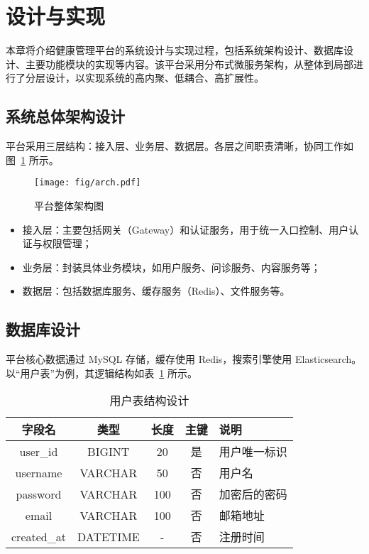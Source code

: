 \section{设计与实现}

本章将介绍健康管理平台的系统设计与实现过程，包括系统架构设计、数据库设计、主要功能模块的实现等内容。该平台采用分布式微服务架构，从整体到局部进行了分层设计，以实现系统的高内聚、低耦合、高扩展性。

\subsection{系统总体架构设计}

平台采用三层结构：接入层、业务层、数据层。各层之间职责清晰，协同工作如图~\ref{fig:arch} 所示。

\begin{figure}[H]
\centering
\texttt{[image: fig/arch.pdf]}
\caption{平台整体架构图}
\label{fig:arch}
\end{figure}

\begin{itemize}
  \item 接入层：主要包括网关（Gateway）和认证服务，用于统一入口控制、用户认证与权限管理；
  \item 业务层：封装具体业务模块，如用户服务、问诊服务、内容服务等；
  \item 数据层：包括数据库服务、缓存服务（Redis）、文件服务等。
\end{itemize}

\subsection{数据库设计}

平台核心数据通过 MySQL 存储，缓存使用 Redis，搜索引擎使用 Elasticsearch。以“用户表”为例，其逻辑结构如表~\ref{tab:user} 所示。

\begin{table}[H]
\centering
\caption{用户表结构设计}
\label{tab:user}
\begin{tabular}{|c|c|c|c|l|}
\hline
字段名 & 类型 & 长度 & 主键 & 说明 \\
\hline
user\_id & BIGINT & 20 & 是 & 用户唯一标识 \\
username & VARCHAR & 50 & 否 & 用户名 \\
password & VARCHAR & 100 & 否 & 加密后的密码 \\
email & VARCHAR & 100 & 否 & 邮箱地址 \\
created\_at & DATETIME & - & 否 & 注册时间 \\
\hline
\end{tabular}
\end{table}

